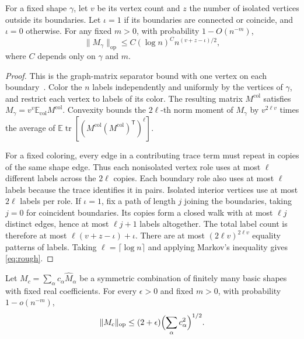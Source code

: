 \documentclass[preprints,article,submit,oneauthor]{Definitions/mdpi}
\newcommand{\E}{\mathbb E}
\newcommand{\tr}{\operatorname{tr}}
\newcommand{\norm}[1]{\lVert #1\rVert}
\newcommand{\op}{\mathrm{op}}
\begin{document}
\begin{Lemma}\label{lem:rough}
For a fixed shape \(\gamma\), let \(v\) be its vertex count and \(z\)
the number of isolated vertices outside its boundaries. Let \(\iota=1\) if
its boundaries are connected or coincide, and \(\iota=0\) otherwise. For
any fixed \(m>0\), with probability \(1-O(n^{-m})\),
\begin{equation}\label{eq:rough}
 \norm{M_\gamma}_{\op}\le C(\log n)^C n^{(v+z-\iota)/2},
\end{equation}
where \(C\) depends only on \(\gamma\) and \(m\).
\end{Lemma}

\begin{proof}
This is the graph-matrix separator bound with one vertex on each
boundary~\cite{AMP}. Color the \(n\) labels independently and uniformly
by the vertices of \(\gamma\), and restrict each vertex to labels of
its color. The resulting matrix \(M^{\mathrm{col}}\) satisfies
\(M_\gamma=v^v\E_{\mathrm{col}} M^{\mathrm{col}}\). Convexity bounds the
\(2\ell\)-th norm moment of \(M_\gamma\) by \(v^{2\ell v}\) times the
average of \(\E\tr[(M^{\mathrm{col}}(M^{\mathrm{col}})^{\mathsf T})^\ell]\).

For a fixed coloring, every edge in a contributing trace term must
repeat in copies of the same shape edge. Thus each nonisolated vertex
role uses at most \(\ell\) different labels across the \(2\ell\) copies.
Each boundary role also uses at most \(\ell\) labels because the trace
identifies it in pairs. Isolated interior vertices use at most \(2\ell\)
labels per role. If \(\iota=1\), fix a path of length \(j\) joining the
boundaries, taking \(j=0\) for coincident boundaries. Its copies form a
closed walk with at most \(\ell j\) distinct edges, hence at most \(\ell j+1\)
labels altogether. The total label count is therefore at most
\(\ell(v+z-\iota)+\iota\). There are at most \((2\ell v)^{2\ell v}\)
equality patterns of labels. Taking \(\ell=\lceil\log n\rceil\) and
applying Markov's inequality gives \eqref{eq:rough}.
\end{proof}

\begin{Lemma}\label{lem:sharp}
Let \(M_c=\sum_\alpha c_\alpha\widehat M_\alpha\) be a symmetric
combination of finitely many basic shapes with fixed real coefficients.
For every \(\epsilon>0\) and fixed \(m>0\), with probability
\(1-o(n^{-m})\),
\begin{equation}\label{eq:sharp}
 \norm{M_c}_{\op}\le(2+\epsilon)\Bigl(\sum_\alpha c_\alpha^2\Bigr)^{1/2}.
\end{equation}
\end{Lemma}
\end{document}
